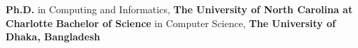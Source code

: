 %
%
%


\begin{scholarship}
					{\textbf{Ph.D.} in Computing and Informatics, \textbf{The University of North Carolina at Charlotte}}
					{\textbf{Bachelor of Science} in Computer Science, \textbf{The University of Dhaka, Bangladesh}}
\end{scholarship}